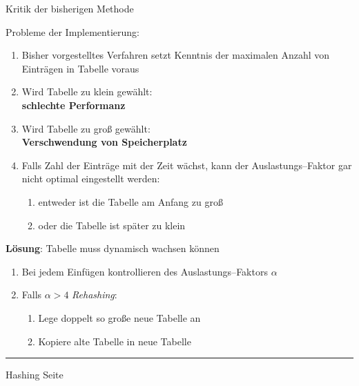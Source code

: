 \begin{slide}{}
\normalsize

\begin{center}
Kritik der bisherigen Methode
\end{center}
\vspace*{0.5cm}

\footnotesize
Probleme der Implementierung:
\begin{enumerate}
\item Bisher vorgestelltes Verfahren setzt Kenntnis 
      der maximalen Anzahl von Eintr\"agen in Tabelle voraus
\item Wird Tabelle zu klein gew\"ahlt: \\[0.3cm]
      \hspace*{1.3cm} \textbf{schlechte Performanz}
\item Wird Tabelle zu gro{\ss} gew\"ahlt: \\[0.3cm]
      \hspace*{1.3cm} \textbf{Verschwendung von Speicherplatz}
\item Falls Zahl der Eintr\"age mit der Zeit w\"achst, kann
      der Auslastungs--Faktor gar nicht optimal eingestellt werden:
      \begin{enumerate}
      \item entweder ist die Tabelle am Anfang zu gro{\ss}
      \item oder die Tabelle ist sp\"ater zu klein
      \end{enumerate}
\end{enumerate}

\textbf{L\"osung}: Tabelle muss dynamisch wachsen k\"onnen
\begin{enumerate}
\item Bei jedem Einf\"ugen kontrollieren des Auslastungs--Faktors $\alpha$
\item Falls $\alpha > 4$ \emph{Rehashing}: 
  \begin{enumerate}
  \item Lege doppelt so gro{\ss}e neue Tabelle an
  \item Kopiere alte Tabelle in neue Tabelle
  \end{enumerate}
\end{enumerate}


\vspace*{\fill}
\tiny \addtocounter{mypage}{1}
\rule{17cm}{1mm}
Hashing  \hspace*{\fill} Seite 
\end{slide}

